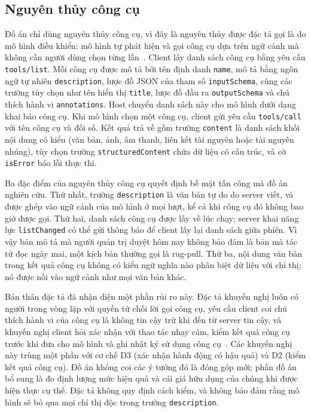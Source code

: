 \documentclass[../DoAn.tex]{subfiles}
\begin{document}
\subsection{Nguyên thủy công cụ}
\label{subsection:3.3.2}

Đồ án chỉ dùng nguyên thủy công cụ, vì đây là nguyên thủy được đặc tả gọi là do mô hình điều khiển: mô hình tự phát hiện và gọi công cụ dựa trên ngữ cảnh mà không cần người dùng chọn từng lần~\cite{mcp2025spec}. Client lấy danh sách công cụ bằng yêu cầu \texttt{tools/list}. Mỗi công cụ được mô tả bởi tên định danh \texttt{name}, mô tả bằng ngôn ngữ tự nhiên \texttt{description}, lược đồ JSON của tham số \texttt{inputSchema}, cùng các trường tùy chọn như tên hiển thị \texttt{title}, lược đồ đầu ra \texttt{outputSchema} và chú thích hành vi \texttt{annotations}. Host chuyển danh sách này cho mô hình dưới dạng khai báo công cụ. Khi mô hình chọn một công cụ, client gửi yêu cầu \texttt{tools/call} với tên công cụ và đối số. Kết quả trả về gồm trường \texttt{content} là danh sách khối nội dung có kiểu (văn bản, ảnh, âm thanh, liên kết tài nguyên hoặc tài nguyên nhúng), tùy chọn trường \texttt{structuredContent} chứa dữ liệu có cấu trúc, và cờ \texttt{isError} báo lỗi thực thi.

Ba đặc điểm của nguyên thủy công cụ quyết định bề mặt tấn công mà đồ án nghiên cứu. Thứ nhất, trường \texttt{description} là văn bản tự do do server viết, và được ghép vào ngữ cảnh của mô hình ở mọi lượt, kể cả khi công cụ đó không bao giờ được gọi. Thứ hai, danh sách công cụ được lấy về lúc chạy; server khai năng lực \texttt{listChanged} có thể gửi thông báo  để client lấy lại danh sách giữa phiên. Vì vậy bản mô tả mà người quản trị duyệt hôm nay không bảo đảm là bản mà tác tử đọc ngày mai, một kịch bản thường gọi là rug-pull. Thứ ba, nội dung văn bản trong kết quả công cụ không có kiểu ngữ nghĩa nào phân biệt dữ liệu với chỉ thị; nó được nối vào ngữ cảnh như mọi văn bản khác.

Bản thân đặc tả đã nhận diện một phần rủi ro này. Đặc tả khuyến nghị luôn có người trong vòng lặp với quyền từ chối lời gọi công cụ, yêu cầu client coi chú thích hành vi của công cụ là không tin cậy trừ khi đến từ server tin cậy, và khuyến nghị client hỏi xác nhận với thao tác nhạy cảm, kiểm kết quả công cụ trước khi đưa cho mô hình và ghi nhật ký sử dụng công cụ~\cite{mcp2025spec}. Các khuyến nghị này trùng một phần với cơ chế D3 (xác nhận hành động có hậu quả) và D2 (kiểm kết quả công cụ). Đồ án không coi các ý tưởng đó là đóng góp mới; phần đồ án bổ sung là đo định lượng mức hiệu quả và cái giá hữu dụng của chúng khi được hiện thực cụ thể. Đặc tả không quy định cách kiểm, và không bảo đảm rằng mô hình sẽ bỏ qua mọi chỉ thị độc trong trường \texttt{description}.
\end{document}
